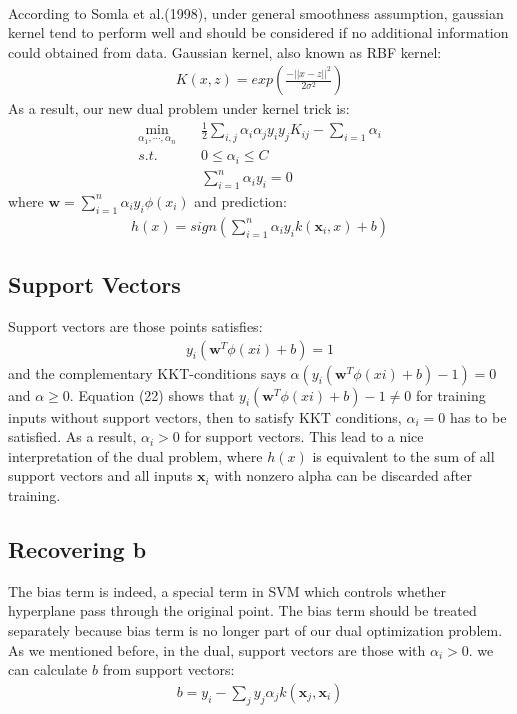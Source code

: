 \documentclass{article}
\newcommand{\upcite}[1]{\textsuperscript{\textsuperscript{\cite{#1}}}}
\begin{document}
\begin{spacing}{1.5}
According to Somla et al.(1998)\upcite{Ref6}, under general smoothness assumption, gaussian kernel tend to perform well and should be considered if no additional information could obtained from data. Gaussian kernel, also known as RBF kernel: 
\begin{align}
K(x,z)=exp(\frac{-||x-z||^2}{2\sigma^2})
\end{align}
As a result, our new dual problem under kernel trick is:
\begin{align}
\min_{\alpha_1,\cdots,\alpha_n}&\quad \frac{1}{2}\sum_{i,j}\alpha_i\alpha_jy_iy_jK_{ij}-\sum_{i=1}\alpha_i\\
s.t.&\quad 0\le\alpha_i\le C\\
&\quad \sum^n_{i=1}\alpha_iy_i=0
\end{align}
where $\bm{w}=\sum^n_{i=1}\alpha_iy_i\phi(x_i)$ and prediction:
\begin{align}
h(x)=sign(\sum^n_{i=1}\alpha_iy_ik(\bm{x}_i,x)+b)
\end{align}

\subsection{Support Vectors}
Support vectors are those points satisfies:
\begin{align}
y_i(\bm{w}^T\phi(xi)+b)=1
\end{align}
and the complementary KKT-conditions says $\alpha(y_i(\bm{w}^T\phi(xi)+b)-1)=0$ and $\alpha\ge0$. Equation (22) shows that $y_i(\bm{w}^T\phi(xi)+b)-1\neq0$ for training inputs without support vectors, then to satisfy KKT conditions, $\alpha_i=0$ has to be satisfied. As a result, $\alpha_i>0$ for support vectors. This lead to a nice interpretation of the dual problem, where $h(x)$ is equivalent to the sum of all support vectors and all inputs $\bm{x}_i$ with nonzero alpha can be discarded after training.

\subsection{Recovering b}
The bias term is indeed, a special term in SVM which controls whether hyperplane pass through the original point. The bias term should be treated separately because bias term is no longer part of our dual optimization problem. As we mentioned before, in the dual, support vectors are those with $\alpha_i>0$. we can calculate $b$ from support vectors:
\begin{align}
b=y_i-\sum_jy_j\alpha_jk(\bm{x}_j, \bm{x}_i)
\end{align}


\end{spacing}
\end{document}
